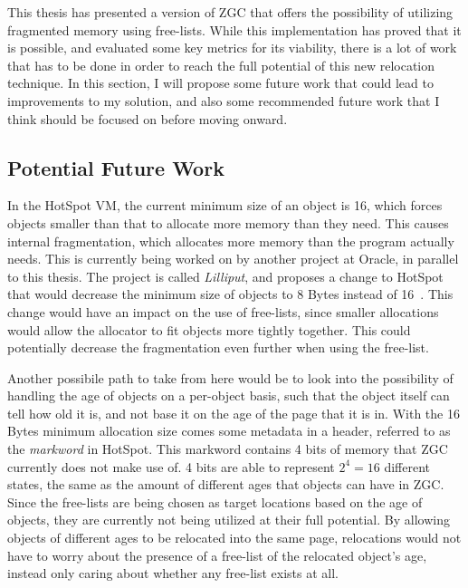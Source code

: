 This thesis has presented a version of ZGC that offers the possibility of utilizing fragmented memory using free-lists. While this implementation has proved that it is possible, and evaluated some key metrics for its viability, there is a lot of work that has to be done in order to reach the full potential of this new relocation technique. In this section, I will propose some future work that could lead to improvements to my solution, and also some recommended future work that I think should be focused on before moving onward.

\subsection{Potential Future Work}
In the HotSpot VM, the current minimum size of an object is 16, which forces objects smaller than that to allocate more memory than they need. This causes internal fragmentation, which allocates more memory than the program actually needs. This is currently being worked on by another project at Oracle, in parallel to this thesis. The project is called \textit{Lilliput}, and proposes a change to HotSpot that would decrease the minimum size of objects to 8 Bytes instead of 16~\cite{todo:-lilliput-sno-från-joel-eller-casper}. This change would have an impact on the use of free-lists, since smaller allocations would allow the allocator to fit objects more tightly together. This could potentially decrease the fragmentation even further when using the free-list.

Another possibile path to take from here would be to look into the possibility of handling the age of objects on a per-object basis, such that the object itself can tell how old it is, and not base it on the age of the page that it is in. With the 16 Bytes minimum allocation size comes some metadata in a header, referred to as the \textit{markword} in HotSpot. This markword contains 4 bits of memory that ZGC currently does not make use of. 4 bits are able to represent $2^4 = 16$ different states, the same as the amount of different ages that objects can have in ZGC. Since the free-lists are being chosen as target locations based on the age of objects, they are currently not being utilized at their full potential. By allowing objects of different ages to be relocated into the same page, relocations would not have to worry about the presence of a free-list of the relocated object's age, instead only caring about whether any free-list exists at all.

